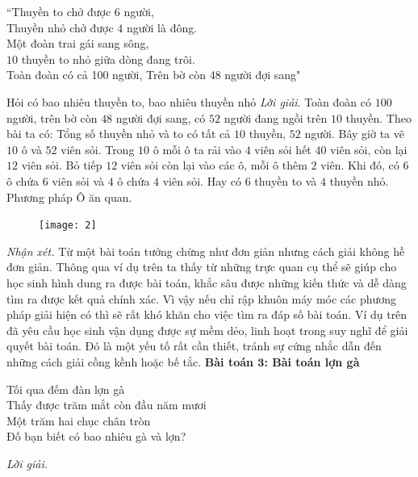 \begin{multicols}{2}
	\begin{center}
		``Thuyền to chở được $6$ người,\\
	Thuyền nhỏ chở được $4$ người là đông.\\
	Một đoàn trai gái sang sông,\\
	$10$ thuyền to nhỏ giữa dòng đang trôi.\\
	Toàn đoàn có cả 100 người, Trên bờ còn 48 người đợi sang"
	\end{center}
	Hỏi có bao nhiêu thuyền to, bao nhiêu thuyền nhỏ
	\vskip 0.1cm
	\textit{Lời giải}.
	Toàn đoàn có $100$ người, trên bờ còn $48$ người đợi sang, có $52$ người đang ngồi trên $10$ thuyền.
	\vskip 0.1cm
	Theo bài ta có: Tổng số thuyền nhỏ và to có tất cả $10$ thuyền, $52$ người.
	\vskip 0.1cm
	Bây giờ ta vẽ $10$ ô và $52$ viên sỏi. Trong $10$ ô mỗi ô ta rải vào $4$ viên sỏi hết $40$ viên sỏi, còn lại $12$ viên sỏi. Bỏ tiếp $12$ viên sỏi còn lại vào các ô, mỗi ô thêm $2$ viên. Khi đó, có $6$ ô chứa $6$ viên sỏi và $4$ ô chứa $4$ viên sỏi. Hay có $6$ thuyền to và $4$ thuyền nhỏ.
	\vskip 0.1cm
	Phương pháp Ô ăn quan.
	\begin{figure}[H]
		\vspace*{-5pt}
		\centering
		\captionsetup{labelformat= empty, justification=centering}
		\texttt{[image: 2]}
		\vspace*{-15pt}
	\end{figure}
	\textit{Nhận xét.}
	Từ một bài toán tưởng chừng như đơn giản nhưng cách giải không hề đơn giản. Thông qua ví dụ trên ta thấy từ những trực quan cụ thể sẽ giúp cho học sinh hình dung ra được bài toán, khắc sâu được những kiến thức và dễ dàng tìm ra được kết quả chính xác.
	\vskip 0.1cm
	Vì vậy nếu chỉ rập khuôn máy móc các phương pháp giải hiện có thì sẽ rất khó khăn cho việc tìm ra đáp số bài toán.
	\vskip 0.1cm
	Ví dụ trên đã yêu cầu học sinh vận dụng được sự mềm dẻo, linh hoạt trong suy nghĩ để giải quyết bài toán. Đó là một yếu tố rất cần thiết, tránh sự cứng nhắc dẫn đến những cách giải cồng kềnh hoặc bế tắc.
	\vskip 0.1cm
	\textbf{Bài toán $\pmb3$: Bài toán lợn gà}
	\begin{center}
		Tối qua đếm đàn lợn gà\\
	Thấy được trăm mắt còn đầu năm mươi\\
	Một trăm hai chục chân tròn\\
	Đố bạn biết có bao nhiêu gà và lợn?
	\end{center}
	\textit{Lời giải.}
	
	
	

\end{multicols}
